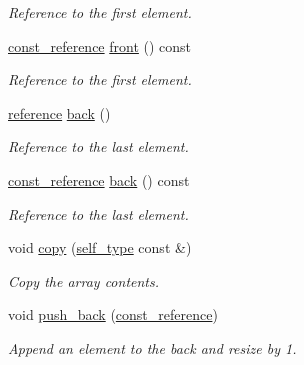 \begin{DoxyCompactItemize}
\begin{DoxyCompactList}\small\item\em Reference to the first element. \item\end{DoxyCompactList}\item 
\hyperlink{classpanda_1_1Collection_a0b74becc406f47de15442c670ae70caf}{const\_\-reference} \hyperlink{classpanda_1_1Collection_a39ebd4f13c72ae9f8e7133b7f9f4a3a5}{front} () const 
\begin{DoxyCompactList}\small\item\em Reference to the first element. \item\end{DoxyCompactList}\item 
\hyperlink{classpanda_1_1Collection_a908a535fcc02ad985ac9eb974f02546f}{reference} \hyperlink{classpanda_1_1Collection_aa4035dd7ed5695992a3f0340feede2c8}{back} ()
\begin{DoxyCompactList}\small\item\em Reference to the last element. \item\end{DoxyCompactList}\item 
\hyperlink{classpanda_1_1Collection_a0b74becc406f47de15442c670ae70caf}{const\_\-reference} \hyperlink{classpanda_1_1Collection_ae59b76d15bd761ecc824edf4222b76c7}{back} () const 
\begin{DoxyCompactList}\small\item\em Reference to the last element. \item\end{DoxyCompactList}\item 
void \hyperlink{classpanda_1_1Collection_ad194c8ae8355ce5ba6c04518a223cde1}{copy} (\hyperlink{classpanda_1_1Collection}{self\_\-type} const \&)
\begin{DoxyCompactList}\small\item\em Copy the array contents. \item\end{DoxyCompactList}\item 
void \hyperlink{classpanda_1_1Collection_a801b74a80bdd197bdfe08a06112bdcee}{push\_\-back} (\hyperlink{classpanda_1_1Collection_a0b74becc406f47de15442c670ae70caf}{const\_\-reference})
\begin{DoxyCompactList}\small\item\em Append an element to the back and resize by 1. \item\end{DoxyCompactList}\item 

\end{DoxyCompactItemize}

